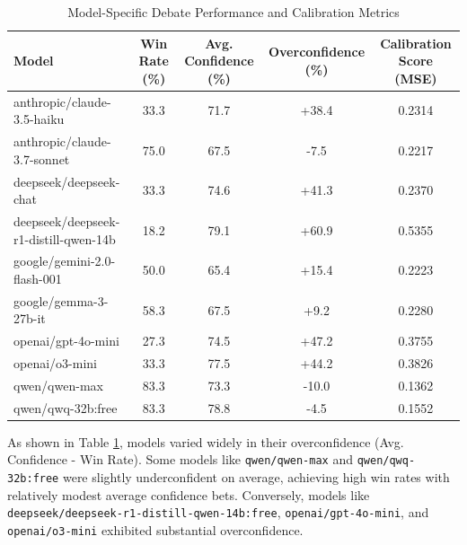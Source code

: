 \documentclass{article}
\begin{document}
\begin{table}[h]
  \caption{Model-Specific Debate Performance and Calibration Metrics}
  \label{tab:model_calibration}
  \centering
  \begin{tabular}{lcccc}
    \toprule
    Model                                   & Win Rate (\%) & Avg. Confidence (\%) & Overconfidence (\%) & Calibration Score (MSE) \\
    \midrule
    anthropic/claude-3.5-haiku              & 33.3          & 71.7                 & +38.4               & 0.2314 \\
    anthropic/claude-3.7-sonnet             & 75.0          & 67.5                 & -7.5                & 0.2217 \\
    deepseek/deepseek-chat                  & 33.3          & 74.6                 & +41.3               & 0.2370 \\
    deepseek/deepseek-r1-distill-qwen-14b   & 18.2          & 79.1                 & +60.9               & 0.5355 \\
    google/gemini-2.0-flash-001             & 50.0          & 65.4                 & +15.4               & 0.2223 \\
    google/gemma-3-27b-it                   & 58.3          & 67.5                 & +9.2                & 0.2280 \\
    openai/gpt-4o-mini                      & 27.3          & 74.5                 & +47.2               & 0.3755 \\
    openai/o3-mini                     & 33.3          & 77.5                 & +44.2               & 0.3826 \\
    qwen/qwen-max                           & 83.3          & 73.3                 & -10.0               & 0.1362 \\
    qwen/qwq-32b:free                       & 83.3          & 78.8                 & -4.5                & 0.1552 \\
    \bottomrule
  \end{tabular}
\end{table}

As shown in Table \ref{tab:model_calibration}, models varied widely in their overconfidence (Avg. Confidence - Win Rate). Some models like \texttt{qwen/qwen-max} and \texttt{qwen/qwq-32b:free} were slightly underconfident on average, achieving high win rates with relatively modest average confidence bets. Conversely, models like \texttt{deepseek/deepseek-r1-distill-qwen-14b:free}, \texttt{openai/gpt-4o-mini}, and \texttt{openai/o3-mini} exhibited substantial overconfidence.
\end{document}

